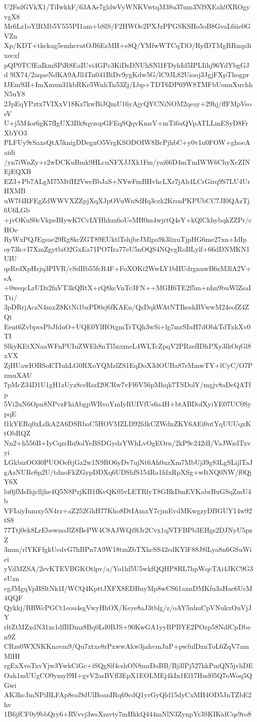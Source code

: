 U2FsdGVkX1/TiIwkkF/63AAe7gldwVyWNKVwtqM38u37um3Nl9XEah9XROgyvgX8
Mr6Lz1oYlRMb5V555PI1am+bSlS/F2HWOe2PXJzPPGSKSHo5oB8GvaL6iie0GVZn
Xp/KDT+tkekag5emhcrutOJl6EzMH+e8Q/YMfwWTCqTlO/RyfDTMgRRmp3ixecxf
pQP0TCfEaIkmSPiR8EaIUvi4GPc3KiDsDNUhSNl1FDyhId5IPLIihj96YdYbgGJd
9lX74/2aqaeNdKA9AJll4Tn041BiDv9ygKdw5G/lC9JL82Uiooj3JgjFXpThogpr
IJEm93I+ImXmun31kbRKe5WnhTn53Zj/Lbp+TDT6DP69W8TMFbUonnXuvhhN5uY8
2JpEqYPztx7VIXxV18Kz7kwBiJQmU16yAjyQYCNiNOM2qeay+29hj/ffFMpVsoeV
U+j5M4or6gK7fIgUX3Bk8qyzopGFEqSQqvKmsV+mTi6uQVpATLLmESyD8FrXbYO3
PLFUy9rSaxsQtA5knigDDegnO5VrgKSODOIW8BcPjhbC+y0v1u0FOW+ghoeAaidi
/yn7iWnZy+r2wDCKuBmk9HLcuNFXJJXk1Fm/yai66D4mTmIWW6ChyXcZINEjEQXB
EZ3+Pb7ALgM75MtfH2VweBbJaS+NYwFmBHvhcLXr7jAh4LCrGirq9S7LU4UrHXMB
uW7f4RFEgZdWWVXZZpjXqXJpOVuWn8dHq3czk2KrsnPKPUbCC7JI0QAzTj6U6LGb
+jvOKuS0cVkpeBIywK7CvLYHhkm6oUeMH0m4wjrtQ4sY+kQlCkhybqkZZPr/cHOe
RyWxPQJEgsae29Rg8kcZGT89EUktlTshjbrJMlpa9k3lixuTjpHG6me27xn+IdIp
oy73h+I7XmZgytbiO2GxEa71PO7Ira77eU5nOQS4NQvgRoBLylf+66dDNMKN1UIU
qsRrdXpHzjq3PIVR/cSdBb55fcR4F+FoXOKi2WwLY1bIIUdrgnnwB6zM3lA2V+sA
+0weqcLzUDz2fnVT3kQRtX+rQ8kcVnTc3FN++MGH6TE2f5m+nhn9buWlZsaITti/
3pDRrjAczN4mxZ8KtNi1bzPD0sj6fKAEn/QzDqkWAtNTIkeshBVwwM24eofZ4ZQt
Eent6ZvbpvsPbJfduO+UQE0YlHOtgmTrTQh3wSi+lg7mrSIuH7dObkTdTxkXv0TI
SlkyKEtXNaaWFnPUIuZWEh8nTl5nxmeL4WLTcZpqV2PRzefIDhPXy3lkOqGl8xVX
ZjHUawIOBSoETIuhLG0RXoYQMzlZS1EqDoX3dOUBa87rMmwTY+lCyC/O7PzmuXAU
7pMcZ34D1U1gH1zUyz8ceRszI20CRw7vFf6V56pMhqk7TSDolY/mgjv8aDeQATfp
5Vi2uN6Opu8NPvzFhiAbgpWRvoYmIyRUIVfUs6a4H+btABDofXyiYE07UC0SypqE
f1kYERq0xLdkA2A6DSRbaC5HOVMZLD92fdkCZWdnZKY6AEi0utYqUUUqxKtObRQZ
Nn2+h556B+IyCqzrRu9olYeBSDGydzYWhLvOgEOrn/2kP9c242dI/VaJWzdTxvyi
LGkbizOO30PUOOeftjGz2w1N9RO6yDv7ujNt6Ah0uzXm7MbUj39g83LgSLijlTaJ
gAzNURc6p2U/tdnoFkZGypDDXq6UDShfS154Ra1fdxRpXSg+wItNQ0NW/f0QjY6X
lu0jfMsIhjclljhe4Q5N8PzjKB1fKvQK05vLETRlyT8GBkDmEVKabrBuGSqZmU4b
VFIaiyIumxy5N4rz+aZ252GhH77Kho8DtIAmxY7cjmEvdMKwgzyDBGUY14w92tS8
77Ttj0ek8LrEbewnoJlZ8BePW4C8AJWQi9lJr2Cvx1qNTFBPb3EHgs2DJNyU5pzZ
3mm/rlYKFfgkUcdvG7hBPn7A9W18tmZbTXhcSS42cdKYlF88J8lLya8n6GSuWiei
yVdMZSA/2evKTEVBGKOtlpv/a/Yo1hf5U5wkfQQHP8RL7hpWqcTAi4JKC9G3eUzn
cgJMgqVpBSltNk1I/WCQ4KpttJXFX8EDBuyMp8wCS61axnDMKfu3aHae6UcM4QQF
Qykkj/BRWcPGCt1eou4sgVwyHhOX/Keye8aJ3tblg/z/oAY5nhuCpVNukxOuVjJY
rltZtMZxdN31xs1dfBDmz8Bq0Ld0BJS+90KwGA1yyBPBYE2POzp58NdfCpDben9Z
CRzs0WXNKKnavm9/Qu7xtxe8rPxwwAkw3jahvmJnP+pwfulDznToL6ZqV7amMlHI
rgExXvoTxvYjw3YwkCiGc+iSQg8lf4cshON8mrDoBB/Bj3lPj527kkPmQN5jvhDE
Oah1mUUgCO9ymyl9H+gvV2asBVff3EpX1EOLMEj4kIn1El17Hud05Q7oWoq5QGwi
AK3hcJmNPiBLFAp8eal9dUlBoanIRq69cdQ1yrGyQld15dyCxMH4OD5JnTZbE2hv
1B6jfCF0y9bbQry6+RVvvj3wsXmvty7mHkkQ444mNlN3ZynpYr3SKIKidCqs9ro8
